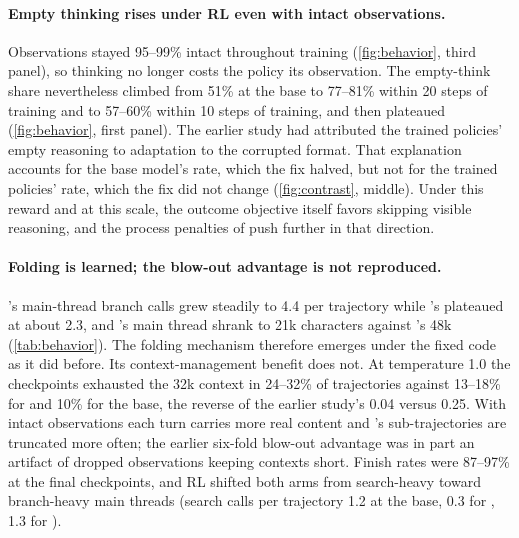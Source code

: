 \paragraph{Empty thinking rises under RL even with intact observations.} Observations stayed
95--99\% intact throughout training (\cref{fig:behavior}, third panel), so thinking no longer
costs the policy its observation. The empty-think share nevertheless climbed from 51\% at the
base to 77--81\% within 20 steps of \foldgrpo{} training and to 57--60\% within 10 steps of
\grpo{} training, and then plateaued (\cref{fig:behavior}, first panel). The earlier study had
attributed the trained policies' empty reasoning to adaptation to the corrupted format. That
explanation accounts for the base model's rate, which the fix halved, but not for the trained
policies' rate, which the fix did not change (\cref{fig:contrast}, middle). Under this reward
and at this scale, the outcome objective itself favors skipping visible reasoning, and the
process penalties of \foldgrpo{} push further in that direction.

\paragraph{Folding is learned; the blow-out advantage is not reproduced.} \foldgrpo{}'s
main-thread branch calls grew steadily to 4.4 per trajectory while \grpo{}'s plateaued at
about 2.3, and \foldgrpo{}'s main thread shrank to 21k characters against \grpo{}'s 48k
(\cref{tab:behavior}). The folding mechanism therefore emerges under the fixed code as it did
before. Its context-management benefit does not. At temperature 1.0 the \foldgrpo{} checkpoints
exhausted the 32k context in 24--32\% of trajectories against 13--18\% for \grpo{} and 10\%
for the base, the reverse of the earlier study's 0.04 versus 0.25. With intact observations
each turn carries more real content and \foldgrpo{}'s sub-trajectories are truncated more
often; the earlier six-fold blow-out advantage was in part an artifact of dropped observations
keeping contexts short. Finish rates were 87--97\% at the final checkpoints, and RL shifted
both arms from search-heavy toward branch-heavy main threads (search calls per trajectory
1.2 at the base, 0.3 for \foldgrpo{}, 1.3 for \grpo{}).
